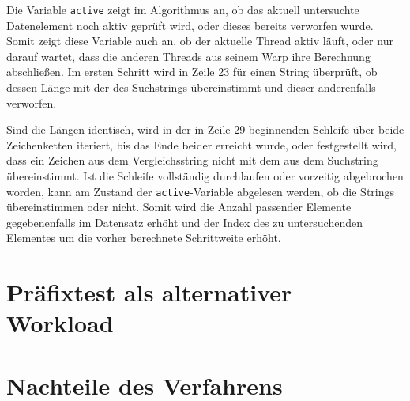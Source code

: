 
Die Variable \texttt{active} zeigt im Algorithmus an, ob das aktuell untersuchte Datenelement noch aktiv geprüft wird, oder dieses bereits verworfen wurde.
Somit zeigt diese Variable auch an, ob der aktuelle Thread aktiv läuft, oder nur darauf wartet, dass die anderen Threads aus seinem Warp ihre Berechnung abschließen.
Im ersten Schritt wird in Zeile 23 für einen String überprüft, ob dessen Länge mit der des Suchstrings übereinstimmt und dieser anderenfalls verworfen.

Sind die Längen identisch, wird in der in Zeile 29 beginnenden Schleife über beide Zeichenketten iteriert, bis das Ende beider erreicht wurde, oder festgestellt wird, dass ein Zeichen aus dem Vergleichsstring nicht mit dem aus dem Suchstring übereinstimmt. %
Ist die Schleife vollständig durchlaufen oder vorzeitig abgebrochen worden, kann am Zustand der \texttt{active}-Variable abgelesen werden, ob die Strings übereinstimmen oder nicht.
Somit wird die Anzahl passender Elemente gegebenenfalls im Datensatz erhöht und der Index des zu untersuchenden Elementes um die vorher berechnete Schrittweite erhöht.


\section{Präfixtest als alternativer Workload}

\section{Nachteile des Verfahrens}